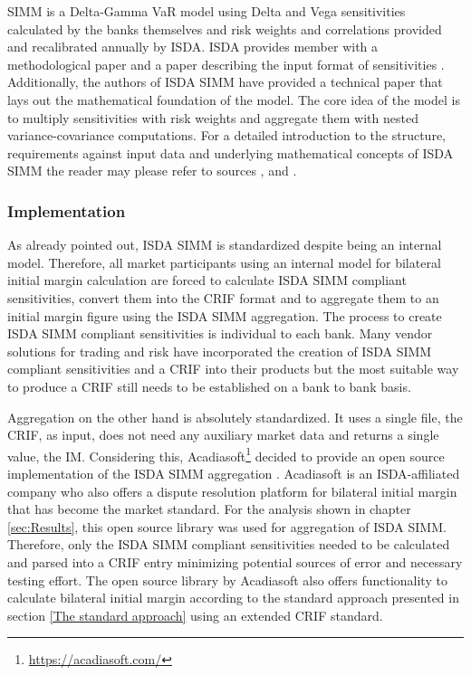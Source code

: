 \documentclass[../Thesis_AHoecherl.tex]{subfiles}
\begin{document}
    SIMM is a Delta-Gamma \gls{VaR} model using Delta and Vega sensitivities calculated by the banks themselves and risk weights and correlations provided and recalibrated annually by \gls{ISDA}. \gls{ISDA} provides member with a methodological paper \cite{SIMM} and a paper describing the input format of sensitivities \cite{RiskDataStandard}.
    Additionally, the authors of \gls{ISDA SIMM} have provided a technical paper \cite{SIMM_technical_paper} that lays out the mathematical foundation of the model. 
    The core idea of the model is to multiply sensitivities with risk weights and aggregate them with nested variance-covariance computations. For a detailed introduction to the structure, requirements against input data and underlying mathematical concepts of \gls{ISDA SIMM} the reader may please refer to sources \cite{SIMM}, \cite{RiskDataStandard} and \cite{SIMM_technical_paper}.

    \subsubsection{Implementation}\label{sec:ISDA SIMM implementation}
    As already pointed out, \gls{ISDA SIMM} is standardized despite being an internal model. Therefore, all market participants using an internal model for bilateral initial margin calculation are forced to calculate \gls{ISDA SIMM} compliant sensitivities, convert them into the \gls{CRIF} format and to aggregate them to an initial margin figure using the \gls{ISDA SIMM} aggregation.
    The process to create \gls{ISDA SIMM} compliant sensitivities is individual to each bank. Many vendor solutions for trading and risk have incorporated the creation of \gls{ISDA SIMM} compliant sensitivities and a \gls{CRIF} into their products but the most suitable way to produce a \gls{CRIF} still needs to be established on a bank to bank basis.
    
    Aggregation on the other hand is absolutely standardized. It uses a single file, the \gls{CRIF}, as input, does not need any auxiliary market data and returns a single value, the IM. 
    Considering this, Acadiasoft\footnote{\url{https://acadiasoft.com/}} decided to provide an open source implementation of the \gls{ISDA SIMM} aggregation \cite{simm-lib}. Acadiasoft is an \gls{ISDA}-affiliated company who also offers a dispute resolution platform for bilateral initial margin that has become the market standard.
    For the analysis shown in chapter \ref{sec:Results}, this open source library was used for aggregation of \gls{ISDA SIMM}. 
    Therefore, only the \gls{ISDA SIMM} compliant sensitivities needed to be calculated and parsed into a \gls{CRIF} entry minimizing potential sources of error and necessary testing effort. The open source library by Acadiasoft also offers functionality to calculate bilateral initial margin according to the standard approach presented in section \ref{The standard approach} using an extended \gls{CRIF} standard.
\end{document}
